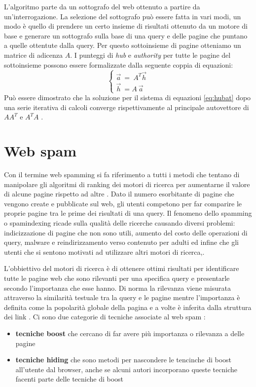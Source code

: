 L'algoritmo parte da un sottografo del web ottenuto a partire da un'interrogazione. La selezione del sottografo può essere fatta in vari modi, un modo è quello di prendere un certo insieme di risultati  ottenuto da un motore di base e generare un sottografo sulla base di una query e delle pagine che puntano a quelle ottentute dalla query. Per questo sottoinsieme di pagine otteniamo un matrice di adicenza \(A\). I punteggi di \textit{hub} e \textit{authority} per tutte le pagine del sottoinsieme possono essere formalizzate dalla seguente coppia di equazioni:
\begin{equation}
 \left\{
 \begin{array}{cc}
    \stackrel{\rightarrow}{a} \: = \: A^T \stackrel{\rightarrow}{h}\\
    \stackrel{\rightarrow}{h} \:= A \: \stackrel{\rightarrow}{a}
 \end{array}
 \right .
 \label{eq:hubat}
\end{equation}
Può essere dimostrato che la soluzione per il sistema di equazioni \ref{eq:hubat} dopo una serie iterativa di calcoli converge rispettivamente al principale autovettore di \(AA^T\) e \(A^TA\) \cite{Manning:2008:IIR:1394399p474}\cite{Spirin:2012:SWS:2207243.2207252}.

\section{Web spam}
Con il termine web spamming si fa riferimento a tutti i metodi che tentano di manipolare gli algoritmi di ranking dei motori di ricerca per aumentarne il valore di alcune pagine rispetto ad altre \cite{ilprints646}.
Dato il numero esorbitante di pagine che vengono create e pubblicate sul web, gli utenti competono per far comparire le proprie pagine tra le prime dei risultati di una query.
Il fenomeno dello spamming o spamindexing ricade sulla qualità delle ricerche causando diversi problemi: indicizzazione di pagine che non sono utili, aumento del costo delle operazioni di query, malware e reindirizzamento verso contenuto per adulti ed infine che gli utenti che si sentono motivati ad utilizzare altri motori di ricerca,\cite{Spirin:2012:SWS:2207243.2207252}.

L'obbiettivo del motori di ricerca è di ottenere ottimi risultati per identificare tutte le pagine web che sono rilevanti per una specifica query e presentarle secondo l'importanza che esse hanno. Di norma la rilevanza viene misurata attraverso la similarità testuale tra la query e le pagine mentre l'importanza è definita come la popolarità globale della pagina e a volte è inferita dalla struttura dei link \cite{ilprints646}. Ci sono due categorie di tecniche associate al web spam \cite{ilprints646}:
\begin{itemize}
\item \textbf{tecniche boost} che cercano di far avere più importanza o rilevanza a delle pagine
\item \textbf{tecniche hiding} che sono metodi per nascondere le tencinche di boost all'utente dal browser, anche se alcuni autori incorporano queste tecniche facenti parte delle tecniche di boost
\end{itemize}

